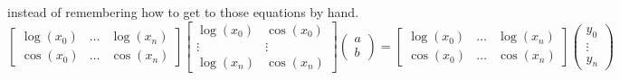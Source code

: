 \begin{example}
    instead of remembering how to get to those equations by hand.
    \[
        \begin{bmatrix}
            \log(x_0) & \dots & \log(x_n)\\
            \cos(x_0) & \dots & \cos(x_n)
        \end{bmatrix}
        \begin{bmatrix}
            \log(x_0) & \cos(x_0) \\
            \vdots & \vdots\\
            \log(x_n) & \cos(x_n)
        \end{bmatrix}
        \begin{pmatrix}
            a \\ b
        \end{pmatrix} = 
        \begin{bmatrix}
            \log(x_0) & \dots & \log(x_n)\\
            \cos(x_0) & \dots & \cos(x_n)
        \end{bmatrix} 
        \begin{pmatrix}
            y_0 \\ \vdots \\ y_n
        \end{pmatrix}
    \]
\end{example}